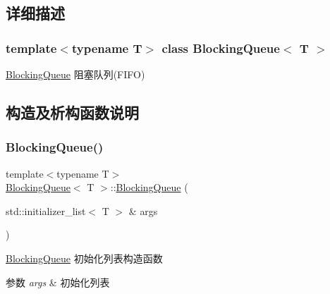 \subsection{详细描述}
\subsubsection*{template$<$typename T$>$\newline
class Blocking\+Queue$<$ T $>$}

\hyperlink{classBlockingQueue}{Blocking\+Queue} 阻塞队列(\+F\+I\+F\+O) 

\subsection{构造及析构函数说明}
\mbox{\label{classBlockingQueue_a265931efcceccd5c99ac76178507559b}} 
\subsubsection{\texorpdfstring{Blocking\+Queue()}{BlockingQueue()}\hspace{0.1cm}{\footnotesize\ttfamily [1/3]}}
{\footnotesize\ttfamily template$<$typename T$>$ \\
\hyperlink{classBlockingQueue}{Blocking\+Queue}$<$ T $>$\+::\hyperlink{classBlockingQueue}{Blocking\+Queue} (\begin{DoxyParamCaption}\item[{std\+::initializer\+\_\+list$<$ T $>$ \&}]{args }\end{DoxyParamCaption})\hspace{0.3cm}{\ttfamily [inline]}}



\hyperlink{classBlockingQueue}{Blocking\+Queue} 初始化列表构造函数 


\begin{DoxyParams}{参数}
{\em args} & 初始化列表 \\
\hline
\end{DoxyParams}
\mbox{\label{classBlockingQueue_a2f2b1e4d887d77a81fddabd44c5cdbfd}} 
